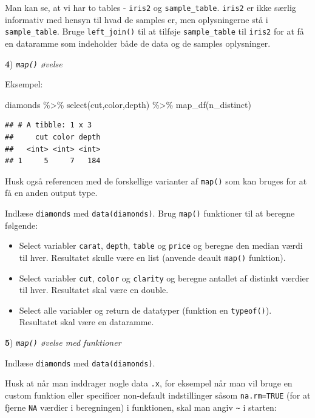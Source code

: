 \documentclass[
]{book}
\newenvironment{Shaded}{\begin{snugshade}}{\end{snugshade}}
\newcommand{\FunctionTok}[1]{\textcolor[rgb]{0.00,0.00,0.00}{#1}}
\newcommand{\NormalTok}[1]{#1}
\newcommand{\SpecialCharTok}[1]{\textcolor[rgb]{0.00,0.00,0.00}{#1}}
\providecommand{\tightlist}{%
  \setlength{\itemsep}{0pt}\setlength{\parskip}{0pt}}
\begin{document}
Man kan se, at vi har to tables - \texttt{iris2} og \texttt{sample\_table}. \texttt{iris2} er ikke særlig informativ med hensyn til hvad de samples er, men oplysningerne stå i \texttt{sample\_table}. Bruge \texttt{left\_join()} til at tilføje \texttt{sample\_table} til \texttt{iris2} for at få en dataramme som indeholder både de data og de samples oplysninger.

\textbf{4}) \emph{\texttt{map()} øvelse}

Eksempel:

\begin{Shaded}
\begin{Highlighting}[]
\NormalTok{diamonds }\SpecialCharTok{\%\textgreater{}\%} \FunctionTok{select}\NormalTok{(cut,color,depth) }\SpecialCharTok{\%\textgreater{}\%} \FunctionTok{map\_df}\NormalTok{(n\_distinct)}
\end{Highlighting}
\end{Shaded}

\begin{verbatim}
## # A tibble: 1 x 3
##     cut color depth
##   <int> <int> <int>
## 1     5     7   184
\end{verbatim}

Husk også referencen med de forskellige varianter af \texttt{map()} som kan bruges for at få en anden output type.

Indlæse \texttt{diamonds} med \texttt{data(diamonds)}. Brug \texttt{map()} funktioner til at beregne følgende:

\begin{itemize}
\tightlist
\item
  Select variabler \texttt{carat}, \texttt{depth}, \texttt{table} og \texttt{price} og beregne den median værdi til hver. Resultatet skulle være en list (anvende deault \texttt{map()} funktion).
\item
  Select variabler \texttt{cut}, \texttt{color} og \texttt{clarity} og beregne antallet af distinkt værdier til hver. Resultatet skal være en double.
\item
  Select alle variabler og return de datatyper (funktion en \texttt{typeof()}). Resultatet skal være en dataramme.
\end{itemize}

\textbf{5}) \emph{\texttt{map()} øvelse med funktioner}

Indlæse \texttt{diamonds} med \texttt{data(diamonds)}.

Husk at når man inddrager nogle data \texttt{.x}, for eksempel når man vil bruge en custom funktion eller specificer non-default indstillinger såsom \texttt{na.rm=TRUE} (for at fjerne \texttt{NA} værdier i beregningen) i funktionen, skal man angiv \texttt{\textasciitilde{}} i starten:
\end{document}
